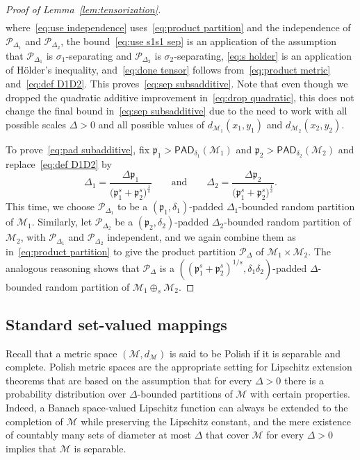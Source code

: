 \documentclass[11pt,reqno]{amsart}
\renewcommand{\d}{\delta}
\theoremstyle{remark}
\newcommand{\MM}{\mathcal{M}}
\renewcommand{\1}{\mathbf 1}
\newcommand{\Part}{\mathscr{P}}
\newcommand{\pad}{\mathsf{PAD}}
\newcommand{\p}{\mathfrak{p}}
\begin{document}
\begin{proof}[Proof of Lemma~\ref{lem:tensorization}]
\begin{align}
\end{align}
where~\eqref{eq:use independence} uses~\eqref{eq:product partition} and the independence of $\Part_{\Delta_1}$ and $\Part_{\Delta_2}$, the bound~\eqref{eq:use s1s1 sep} is an application of the assumption that $\Part_{\Delta_1}$ is $\sigma_1$-separating and  $\Part_{\Delta_2}$ is $\sigma_2$-separating, \eqref{eq:s holder} is an application of H\"older's inequality, and~\eqref{eq:done tensor} follows from~\eqref{eq:product metric} and~\eqref{eq:def D1D2}. This proves~\eqref{eq:sep subsadditive}. Note that even though we dropped the quadratic additive improvement in~\eqref{eq:drop quadratic}, this does not change the final bound in~\eqref{eq:sep subsadditive} due to the need to work with all possible scales $\Delta>0$ and all possible values of $d_{\MM_1}(x_1,y_1)$ and $d_{\MM_2}(x_2,y_2)$.

To prove~\eqref{eq:pad subadditive}, fix $\p_1>\pad_{\d_1}(\MM_1)$ and $\p_2>\pad_{\d_2}(\MM_2)$ and replace~\eqref{eq:def D1D2} by
\begin{equation*}\label{eq:p1p2 tensor}
\Delta_1=\frac{\Delta\p_1}{\big(\p_1^s+\p_2^s\big)^{\frac{1}{s}}}   \qquad\mathrm{and}\qquad  \Delta_2=\frac{\Delta\p_2}{\big(\p_1^s+\p_2^s\big)^{\frac{1}{s}}}.
\end{equation*}
This time, we choose $\Part_{\Delta_1}$ to be a $(\p_1,\d_1)$-padded $\Delta_1$-bounded random partition of $\MM_1$. Similarly, let  $\Part_{\Delta_2}$    be a
$(\p_2,\d_2)$-padded $\Delta_2$-bounded random  partition of $\MM_2$, with $\Part_{\Delta_1}$ and $\Part_{\Delta_2}$ independent, and
we again combine them as in~\eqref{eq:product partition} to give  the product partition $\Part_\Delta$  of $\MM_1\times \MM_2$.
The analogous reasoning shows that $\Part_\Delta$ is a $((\p_1^s+\p_2^s)^{1/s},\d_1\d_2)$-padded $\Delta$-bounded random partition of
$\MM_1\oplus_s\MM_2$.
\end{proof}



\subsection{Standard set-valued mappings}\label{sec:standard} Recall that a metric space $(\MM,d_\MM)$ is said to be {Polish} if it is separable and complete. Polish metric spaces are the appropriate setting for Lipschitz extension theorems that are based on the assumption that for every $\Delta>0$ there is a probability distribution over $\Delta$-bounded partitions of $\MM$ with certain properties. Indeed,  a Banach space-valued Lipschitz function can always be extended to the completion of $\MM$ while preserving the Lipschitz constant, and the mere existence of countably many sets of diameter at most $\Delta$ that cover $\MM$ for every $\Delta>0$ implies that $\MM$ is separable.
\end{document}
